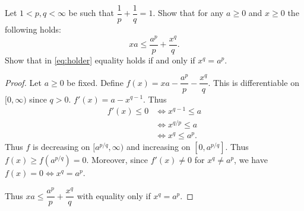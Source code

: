 \documentclass[12pt]{article}
\begin{document}
\begin{problem}
    Let $1 < p, q < \infty$ be such that $\dfrac1p + \dfrac1q = 1$.
    Show that for any $a \ge 0$ and $x \ge 0$ the following holds: \begin{equation}
        xa \le \frac{a^p}{p} + \frac{x^q}{q}. \label{eq:holder}
    \end{equation}
    Show that in \cref{eq:holder} equality holds if and only if $x^q = a^p$.
\end{problem}
\begin{proof}
    Let $a \ge 0$ be fixed.
    Define $f(x) = xa - \dfrac{a^p}{p} - \dfrac{x^q}{q}$.
    This is differentiable on $[0, \infty)$ since $q > 0$.
    $f'(x) = a - x^{q-1}$.
    Thus \begin{align*}
        f'(x) \le 0 &\iff x^{q-1} \le a \\
        &\iff x^{q/p} \le a \\
        &\iff x^q \le a^p.
    \end{align*}
    Thus $f$ is decreasing on $[a^{p/q}, \infty)$ and increasing on
    $[0, a^{p/q}]$.
    Thus $f(x) \ge f(a^{p/q}) = 0$.
    Moreover, since $f'(x) \ne 0$ for $x^q \ne a^p$, we have
    $f(x) = 0 \iff x^q = a^p$.

    Thus $xa \le \dfrac{a^p}{p} + \dfrac{x^q}{q}$ with equality
    only if $x^q = a^p$.
\end{proof}
\end{document}
